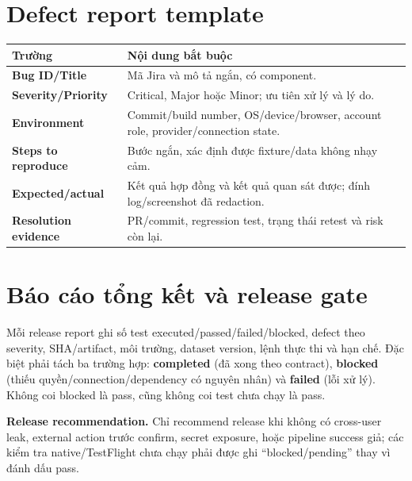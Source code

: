 \documentclass[11pt,a4paper]{article}
\begin{document}
\section{Defect report template}
\begin{tabularx}{\textwidth}{>{\bfseries}p{3.4cm}X}
\toprule Trường & Nội dung bắt buộc \\ \midrule
Bug ID/Title & Mã Jira và mô tả ngắn, có component. \\
Severity/Priority & Critical, Major hoặc Minor; ưu tiên xử lý và lý do. \\
Environment & Commit/build number, OS/device/browser, account role, provider/connection state. \\
Steps to reproduce & Bước ngắn, xác định được fixture/data không nhạy cảm. \\
Expected/actual & Kết quả hợp đồng và kết quả quan sát được; đính log/screenshot đã redaction. \\
Resolution evidence & PR/commit, regression test, trạng thái retest và risk còn lại. \\
\bottomrule
\end{tabularx}

\section{Báo cáo tổng kết và release gate}
Mỗi release report ghi số test executed/passed/failed/blocked, defect theo severity, SHA/artifact, môi trường, dataset version, lệnh thực thi và hạn chế. Đặc biệt phải tách ba trường hợp: \textbf{completed} (đã xong theo contract), \textbf{blocked} (thiếu quyền/connection/dependency có nguyên nhân) và \textbf{failed} (lỗi xử lý). Không coi blocked là pass, cũng không coi test chưa chạy là pass.

\begin{center}\colorbox{mondaiylight}{\parbox{0.86\textwidth}{\textbf{Release recommendation.} Chỉ recommend release khi không có cross-user leak, external action trước confirm, secret exposure, hoặc pipeline success giả; các kiểm tra native/TestFlight chưa chạy phải được ghi ``blocked/pending'' thay vì đánh dấu pass.}}\end{center}
\end{document}

